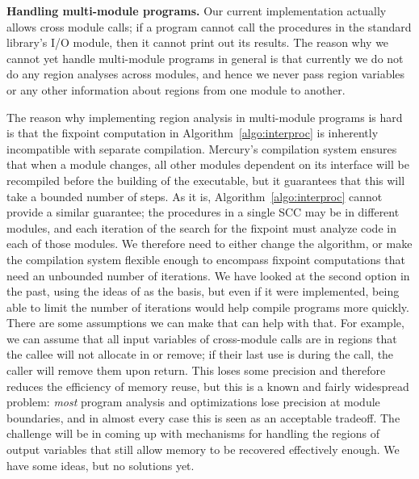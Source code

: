 \documentclass{tlp}
\begin{document}
\noindent\textbf{Handling multi-module programs.}
Our current implementation actually allows cross module calls;
if a program cannot call the procedures in the standard library's I/O module,
then it cannot print out its results.
The reason why we cannot yet handle multi-module programs in general
is that currently we do not do any region analyses across modules,
and hence we never pass region variables or any other information about regions
from one module to another.

The reason why implementing region analysis in multi-module programs is hard
is that the fixpoint computation in Algorithm~\ref{algo:interproc}
is inherently incompatible with separate compilation.
Mercury's compilation system ensures that when a module changes,
all other modules dependent on its interface will be recompiled
before the building of the executable,
but it guarantees that this will take a bounded number of steps.
As it is, Algorithm~\ref{algo:interproc} cannot provide a similar guarantee;
the procedures in a single SCC may be in different modules,
and each iteration of the search for the fixpoint
must analyze code in each of those modules.
We therefore need to either change the algorithm,
or make the compilation system flexible enough
to encompass fixpoint computations that need an unbounded number of iterations.
We have looked at the second option in the past,
using the ideas of \cite{latexmodel} as the basis,
but even if it were implemented,
being able to limit the number of iterations
would help compile programs more quickly.
There are some assumptions we can make that can help with that.
For example, we can assume that all input variables of cross-module calls
are in regions that the callee will not allocate in or remove;
if their last use is during the call, the caller will remove them upon return.
This loses some precision and therefore reduces the efficiency of memory reuse,
but this is a known and fairly widespread problem:
\emph{most} program analysis and optimizations
lose precision at module boundaries,
and in almost every case this is seen as an acceptable tradeoff.
The challenge will be in coming up with mechanisms
for handling the regions of output variables
that still allow memory to be recovered effectively enough.
We have some ideas, but no solutions yet.
\end{document}
